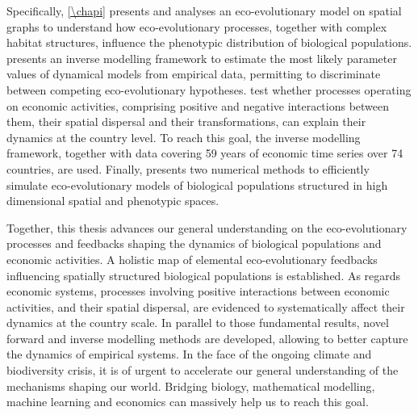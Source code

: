 {Specifically, \cref{\chapi} presents and analyses an eco-evolutionary model on spatial graphs to understand how eco-evolutionary processes, together with complex habitat structures, influence the phenotypic distribution of biological populations. \Cref{\chapii} presents an inverse modelling framework to estimate the most likely parameter values of dynamical models from empirical data, permitting to discriminate between competing eco-evolutionary hypotheses. \Cref{\chapiv} test whether processes operating on economic activities, comprising positive and negative interactions between them, their spatial dispersal and their transformations, can explain their dynamics at the country level. To reach this goal, the inverse modelling framework, together with data covering 59 years of economic time series over 74 countries, are used. Finally, \Cref{\chapiv} presents two numerical methods to efficiently simulate eco-evolutionary models of biological populations structured in high dimensional spatial and phenotypic spaces.

Together, this thesis advances our general understanding on the eco-evolutionary processes and feedbacks shaping the dynamics of biological populations and economic activities. A holistic map of elemental eco-evolutionary feedbacks influencing spatially structured biological populations is established. As regards economic systems, processes involving positive interactions between economic activities, and their spatial dispersal, are evidenced to systematically affect their dynamics at the country scale.
% 
In parallel to those fundamental results, novel forward and inverse modelling methods are developed, allowing to better capture the dynamics of empirical systems.
% 
In the face of the ongoing climate and biodiversity crisis, it is of urgent to accelerate our general understanding of the mechanisms shaping our world.
% 
Bridging biology, mathematical modelling, machine learning and economics can massively help us to reach this goal.
}


